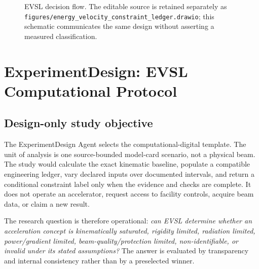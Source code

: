 \documentclass[conference]{../../../../Conference-LaTeX-template_10-17-19/IEEEtran}
\begin{document}
\begin{figure}[!t]
\centering
{}
\caption{EVSL decision flow. The editable source is retained separately as \texttt{figures/energy\_velocity\_constraint\_ledger.drawio}; this schematic communicates the same design without asserting a measured classification.}
\label{fig:evsl}
\end{figure}

\section{ExperimentDesign: EVSL Computational Protocol}
\subsection{Design-only study objective}
The ExperimentDesign Agent selects the computational-digital template. The unit of analysis is one source-bounded model-card scenario, not a physical beam. The study would calculate the exact kinematic baseline, populate a compatible engineering ledger, vary declared inputs over documented intervals, and return a conditional constraint label only when the evidence and checks are complete. It does not operate an accelerator, request access to facility controls, acquire beam data, or claim a new result.

The research question is therefore operational: \emph{can EVSL determine whether an acceleration concept is kinematically saturated, rigidity limited, radiation limited, power/gradient limited, beam-quality/protection limited, non-identifiable, or invalid under its stated assumptions?} The answer is evaluated by transparency and internal consistency rather than by a preselected winner.
\end{document}
